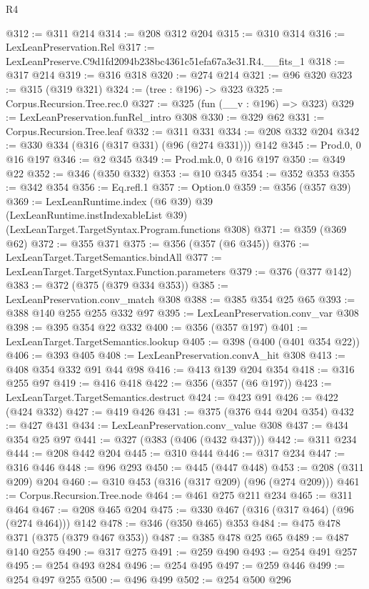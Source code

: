 \begin{lexlean}{R4}
\begin{coremodule}
@312 := @311 @214
@314 := @208 @312 @204
@315 := @310 @314
@316 := LexLeanPreservation.Rel
@317 := LexLeanPreserve.C9d1fd2094b238bc4361c51efa67a3e31.R4.__fits_1
@318 := @317 @214
@319 := @316 @318
@320 := @274 @214
@321 := @96 @320
@323 := @315 (@319 @321)
@324 := (tree : @196) -> @323
@325 := Corpus.Recursion.Tree.rec.{0}
@327 := @325 (fun (__v : @196) => @323)
@329 := LexLeanPreservation.funRel_intro @308
@330 := @329 @62
@331 := Corpus.Recursion.Tree.leaf
@332 := @311 @331
@334 := @208 @332 @204
@342 := @330 @334 (@316 (@317 @331) (@96 (@274 @331))) @142
@345 := Prod.{0, 0} @16 @197
@346 := @2 @345
@349 := Prod.mk.{0, 0} @16 @197
@350 := @349 @22
@352 := @346 (@350 @332)
@353 := @10 @345
@354 := @352 @353
@355 := @342 @354
@356 := Eq.refl.{1}
@357 := Option.{0}
@359 := @356 (@357 @39)
@369 := LexLeanRuntime.index
    (@6 @39)
    @39
    (LexLeanRuntime.instIndexableList @39)
    (LexLeanTarget.TargetSyntax.Program.functions @308)
@371 := @359 (@369 @62)
@372 := @355 @371
@375 := @356 (@357 (@6 @345))
@376 := LexLeanTarget.TargetSemantics.bindAll
@377 := LexLeanTarget.TargetSyntax.Function.parameters
@379 := @376 (@377 @142)
@383 := @372 (@375 (@379 @334 @353))
@385 := LexLeanPreservation.conv_match @308
@388 := @385 @354 @25 @65
@393 := @388 @140 @255 @255 @332 @97
@395 := LexLeanPreservation.conv_var @308
@398 := @395 @354 @22 @332
@400 := @356 (@357 @197)
@401 := LexLeanTarget.TargetSemantics.lookup
@405 := @398 (@400 (@401 @354 @22))
@406 := @393 @405
@408 := LexLeanPreservation.convA_hit @308
@413 := @408 @354 @332 @91 @44 @98
@416 := @413 @139 @204 @354
@418 := @316 @255 @97
@419 := @416 @418
@422 := @356 (@357 (@6 @197))
@423 := LexLeanTarget.TargetSemantics.destruct
@424 := @423 @91
@426 := @422 (@424 @332)
@427 := @419 @426
@431 := @375 (@376 @44 @204 @354)
@432 := @427 @431
@434 := LexLeanPreservation.conv_value @308
@437 := @434 @354 @25 @97
@441 := @327 (@383 (@406 (@432 @437)))
@442 := @311 @234
@444 := @208 @442 @204
@445 := @310 @444
@446 := @317 @234
@447 := @316 @446
@448 := @96 @293
@450 := @445 (@447 @448)
@453 := @208 (@311 @209) @204
@460 := @310 @453 (@316 (@317 @209) (@96 (@274 @209)))
@461 := Corpus.Recursion.Tree.node
@464 := @461 @275 @211 @234
@465 := @311 @464
@467 := @208 @465 @204
@475 := @330 @467 (@316 (@317 @464) (@96 (@274 @464))) @142
@478 := @346 (@350 @465) @353
@484 := @475 @478 @371 (@375 (@379 @467 @353))
@487 := @385 @478 @25 @65
@489 := @487 @140 @255
@490 := @317 @275
@491 := @259 @490
@493 := @254 @491 @257
@495 := @254 @493 @284
@496 := @254 @495
@497 := @259 @446
@499 := @254 @497 @255
@500 := @496 @499
@502 := @254 @500 @296

\end{coremodule}
\end{lexlean}
